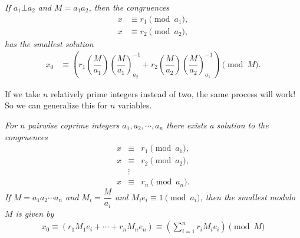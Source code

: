 \documentclass{subfile}
\begin{document}
		\begin{theorem}\slshape
			If $a_1\bot a_2$ and $M=a_1a_2$, then the congruences	
			\begin{align*}
			x & \equiv r_1\pmod{a_1},\\
			x & \equiv r_2\pmod{a_2},
			\end{align*}
			has the smallest solution
			\begin{align*}
			x_0 & \equiv 
			\left(r_1\left(\dfrac{M}{a_1}\right)\left(\dfrac{M}{a_1}\right)^{-1}_{a_2}+r_2\left(\dfrac{M}{a_2}\right)\left(\dfrac{M}{a_2}\right)^{-1}_{a_1}\right)\pmod{M}.
			\end{align*}
		\end{theorem}
	If we take $n$ relatively prime integers instead of two, the same process will work! So we can generalize this for $n$ variables.
		\begin{theorem}[CRT]\slshape
			For $n$ pairwise coprime integers $a_1,a_2,\cdots,a_n$ there exists a solution to the congruences
			\begin{eqnarray*}
			x & \equiv& r_1\pmod{a_1},\\
			x & \equiv& r_2\pmod{a_2},\\
			   &\vdots&\\
			x & \equiv& r_n\pmod{a_n}.
			\end{eqnarray*}
			If $M=a_1a_2\cdots a_n$ and $M_i=\dfrac{M}{a_i}$ and $M_ie_i\equiv1\pmod{a_i}$, then the smallest  modulo $M$ is given by
			\begin{align*}
			x_0  \equiv \left(r_1 M_1e_i+\cdots+r_n M_ne_n\right)\equiv \left(\sum_{i=1}^{n} r_i M_ie_i\right)\pmod M
			\end{align*}
		\end{theorem}
	
\end{document}
